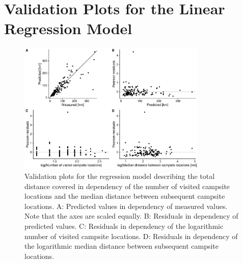 \documentclass[]{elsarticle} %
\begin{document}
\hypertarget{validation-plots-for-the-linear-regression-model}{%
\section{Validation Plots for the Linear Regression
Model}\label{validation-plots-for-the-linear-regression-model}}

\begin{figure}[H]

{\centering \includegraphics[width=0.8\textwidth]{../figures/regression-total-distance-validation-1} 

}

\caption{Validation plots for the regression model describing the total distance covered in dependency of the number of visited campsite locations and the median distance between subsequent campsite locations. A: Predicted values in dependency of measured values. Note that the axes are scaled equally. B: Residuals in dependency of predicted values. C: Residuals in dependency of the logarithmic number of visited campsite locations. D: Residuals in dependency of the logarithmic median distance between subsequent campsite locations.}\label{fig:regression-total-distance-validation}
\end{figure}
\end{document}
